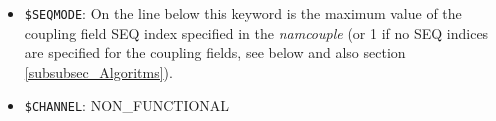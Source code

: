 \begin{itemize}

\item {\tt \$SEQMODE}: On the line below this keyword is the maximum value of the coupling field SEQ index
specified in the {\it namcouple}
(or 1 if no SEQ indices are specified for the coupling fields, see below and also section
  \ref{subsubsec_Algoritms}).

\item {\tt \$CHANNEL}: NON\_FUNCTIONAL


\end{itemize}
